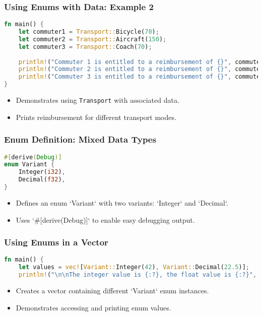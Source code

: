 \documentclass[aspectratio=169, table]{beamer}
\begin{document}
\begin{frame}[fragile]
\frametitle{Using Enums with Data: Example 2}
\vspace{15pt}
\begin{lstlisting}[language=Rust]
fn main() {
	let commuter1 = Transport::Bicycle(70); 
	let commuter2 = Transport::Aircraft(150); 
	let commuter3 = Transport::Coach(70); 
	
	println!("Commuter 1 is entitled to a reimbursement of {}", commuter1.reimbursement()); 
	println!("Commuter 2 is entitled to a reimbursement of {}", commuter2.reimbursement()); 
	println!("Commuter 3 is entitled to a reimbursement of {}", commuter3.reimbursement()); 
}
\end{lstlisting}
\begin{itemize}
\item Demonstrates using \texttt{Transport} with associated data.
\item Prints reimbursement for different transport modes.
\end{itemize}
\end{frame}

\begin{frame}[fragile]
\frametitle{Enum Definition: Mixed Data Types}
\begin{lstlisting}[language=Rust]
#[derive(Debug)]
enum Variant {
	Integer(i32), 
	Decimal(f32),
}
\end{lstlisting}
\begin{itemize}
\item Defines an enum `Variant` with two variants: `Integer` and `Decimal`.
\item Uses `\#[derive(Debug)]` to enable easy debugging output.
\end{itemize}
\end{frame}

\begin{frame}[fragile]
\frametitle{Using Enums in a Vector}
\begin{lstlisting}[language=Rust]
fn main() {
	let values = vec![Variant::Integer(42), Variant::Decimal(22.5)]; 
	println!("\n\nThe integer value is {:?}, the float value is {:?}", values[0], values[1]); 
\end{lstlisting}
\begin{itemize}
	\item Creates a vector containing different `Variant` enum instances.
	\item Demonstrates accessing and printing enum values.
\end{itemize}
\end{frame}
\end{document}
